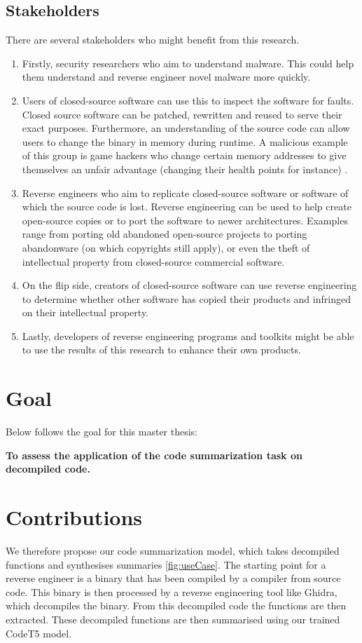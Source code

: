 \subsection{Stakeholders}
There are several stakeholders who might benefit from this research. 
\begin{enumerate}
    \item Firstly, security researchers who aim to understand malware. This could help them understand and reverse engineer novel malware more quickly.
    \item Users of closed-source software can use this to inspect the software for faults. Closed source software can be patched, rewritten and reused to serve their exact purposes. Furthermore, an understanding of the source code can allow users to change the binary in memory during runtime. A malicious example of this group is game hackers who change certain memory addresses to give themselves an unfair advantage (changing their health points for instance) \cite{TypeInferenceSurvey}. 
    \item Reverse engineers who aim to replicate closed-source software or software of which the source code is lost. Reverse engineering can be used to help create open-source copies or to port the software to newer architectures. Examples range from porting old abandoned open-source projects to porting abandonware (on which copyrights still apply), or even the theft of intellectual property from closed-source commercial software.
    \item On the flip side, creators of closed-source software can use reverse engineering to determine whether other software has copied their products and infringed on their intellectual property.
    \item Lastly, developers of reverse engineering programs and toolkits might be able to use the results of this research to enhance their own products. 
\end{enumerate}

\section{Goal}
Below follows the goal for this master thesis:\\

\centerline{\textbf{To assess the application of the code summarization task on decompiled code.}}

\section{Contributions}
We therefore propose our code summarization model, which takes decompiled functions and synthesises summaries \ref{fig:useCase}. The starting point for a reverse engineer is a binary that has been compiled by a compiler from source code. This binary is then processed by a reverse engineering tool like Ghidra, which decompiles the binary. From this decompiled code the functions are then extracted. These decompiled functions are then summarised using our trained CodeT5 \cite{CodeT5} model.

